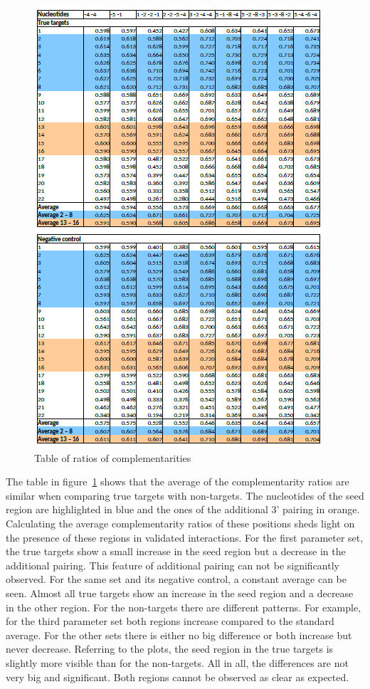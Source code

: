 \documentclass[12pt]{article}
\begin{document}
\begin{figure}
\centering
\includegraphics[scale=1.1]{results/ratio_table2.PNG}
\caption{Table of ratios of complementarities}
\label{table:ratios}
\end{figure}



The table in figure~\ref{table:ratios} shows that the average of the complementarity ratios are similar when comparing true targets with non-targets. The nucleotides of the seed region are highlighted in blue and the ones of the additional 3' pairing in orange. Calculating the average complementarity ratios of these positions sheds light on the presence of these regions in validated interactions. For the first parameter set, the true targets show a small increase in the seed region but a decrease in the additional pairing. This feature of additional pairing can not be significantly observed. For the same set and its negative control, a constant average can be seen. Almost all true targets show an increase in the seed region and a decrease in the other region. For the non-targets there are different patterns. For example, for the third parameter set both regions increase compared to the standard average. For the other sets there is either no big difference or both increase but never decrease. Referring to the plots, the seed region in the true targets is slightly more visible than for the non-targets. All in all, the differences are not very big and significant. Both regions cannot be observed as clear as expected.  \\
\end{document}
